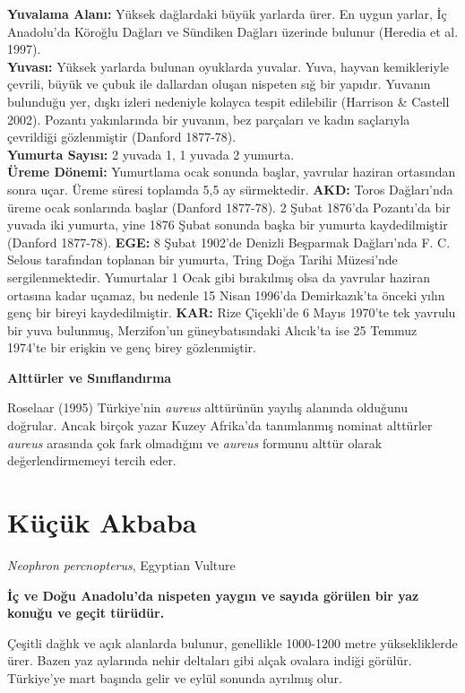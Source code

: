 \documentclass[
  letterpaper,
  DIV=11,
  numbers=noendperiod]{scrreprt}
\begin{document}
\textbf{Yuvalama Alanı:} Yüksek dağlardaki büyük yarlarda ürer. En uygun
yarlar, İç Anadolu'da Köroğlu Dağları ve Sündiken Dağları üzerinde
bulunur (Heredia et al. 1997).\\
\textbf{Yuvası:} Yüksek yarlarda bulunan oyuklarda yuvalar. Yuva, hayvan
kemikleriyle çevrili, büyük ve çubuk ile dallardan oluşan nispeten sığ
bir yapıdır. Yuvanın bulunduğu yer, dışkı izleri nedeniyle kolayca
tespit edilebilir (Harrison \& Castell 2002). Pozantı yakınlarında bir
yuvanın, bez parçaları ve kadın saçlarıyla çevrildiği gözlenmiştir
(Danford 1877-78).\\
\textbf{Yumurta Sayısı:} 2 yuvada 1, 1 yuvada 2 yumurta.\\
\textbf{Üreme Dönemi:} Yumurtlama ocak sonunda başlar, yavrular haziran
ortasından sonra uçar. Üreme süresi toplamda 5,5 ay sürmektedir.
\textbf{AKD:} Toros Dağları'nda üreme ocak sonlarında başlar (Danford
1877-78). 2 Şubat 1876'da Pozantı'da bir yuvada iki yumurta, yine 1876
Şubat sonunda başka bir yumurta kaydedilmiştir (Danford 1877-78).
\textbf{EGE:} 8 Şubat 1902'de Denizli Beşparmak Dağları'nda F. C. Selous
tarafından toplanan bir yumurta, Tring Doğa Tarihi Müzesi'nde
sergilenmektedir. Yumurtalar 1 Ocak gibi bırakılmış olsa da yavrular
haziran ortasına kadar uçamaz, bu nedenle 15 Nisan 1996'da Demirkazık'ta
önceki yılın genç bir bireyi kaydedilmiştir. \textbf{KAR:} Rize
Çiçekli'de 6 Mayıs 1970'te tek yavrulu bir yuva bulunmuş, Merzifon'un
güneybatısındaki Alıcık'ta ise 25 Temmuz 1974'te bir erişkin ve genç
birey gözlenmiştir.

\textbf{Alttürler ve Sınıflandırma}

Roselaar (1995) Türkiye'nin \emph{aureus} alttürünün yayılış alanında
olduğunu doğrular. Ancak birçok yazar Kuzey Afrika'da tanımlanmış
nominat alttürler \emph{aureus} arasında çok fark olmadığını ve
\emph{aureus} formunu alttür olarak değerlendirmemeyi tercih eder.

\section{Küçük Akbaba}\label{kuxfcuxe7uxfck-akbaba}

\emph{Neophron percnopterus}, Egyptian Vulture

\textbf{İç ve Doğu Anadolu'da nispeten yaygın ve sayıda görülen bir yaz
konuğu ve geçit türüdür.}

Çeşitli dağlık ve açık alanlarda bulunur, genellikle 1000-1200 metre
yüksekliklerde ürer. Bazen yaz aylarında nehir deltaları gibi alçak
ovalara indiği görülür. Türkiye'ye mart başında gelir ve eylül sonunda
ayrılmış olur.
\end{document}

